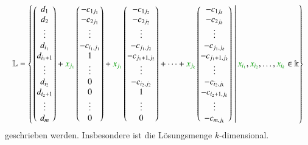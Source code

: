 \[
\mathbb{L}
=
\left\{
\left.
\begin{pmatrix}
d_1\\
d_2\\
\vdots\\
d_{i_1}\\
d_{i_1+1}\\
\vdots\\
d_{i_2}\\
d_{i_2+1}\\
\vdots\\
d_{m}
\end{pmatrix}
+
{\color{darkgreen}x_{j_1}}
\begin{pmatrix}
-c_{1j_1}\\
-c_{2j_1}\\
\vdots\\
-c_{i_1,j_1}\\
1\\
\vdots\\
0\\
0\\
\vdots\\
0\\
\end{pmatrix}
+
{\color{darkgreen}x_{j_1}}
\begin{pmatrix}
-c_{1j_2}\\
-c_{2j_2}\\
\vdots\\
-c_{j_1,j_2}\\
-c_{j_1+1,j_2}\\
\vdots\\
-c_{i_2,j_2}\\
1\\
\vdots\\
0\\
\end{pmatrix}
+
\dots
+
{\color{darkgreen}x_{j_k}}
\begin{pmatrix}
-c_{1j_k}\\
-c_{2j_k}\\
\vdots\\
-c_{j_1,j_k}\\
-c_{j_1+1,j_k}\\
\vdots\\
-c_{i_2,j_k}\\
-c_{i_2+1,j_k}\\
\vdots\\
-c_{m,j_k}\\
\end{pmatrix}
\;
\right|
{\color{darkgreen}x_{i_1}},{\color{darkgreen}x_{i_2}},\dots,{\color{darkgreen}x_{i_k}}\in\Bbbk
\right\}
\]
geschrieben werden.
Insbesondere ist die Lösungsmenge $k$-dimensional.

